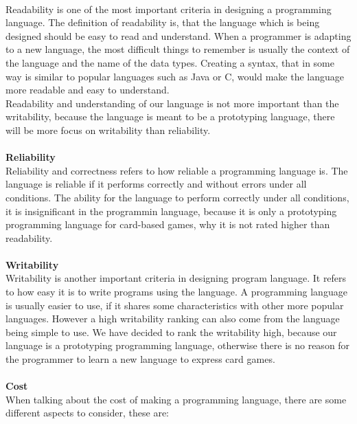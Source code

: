  \\
Readability is one of the most important criteria in designing a programming language. The definition of readability is, that the language which is being designed should be easy to read and understand. When a programmer is adapting to a new language, the most difficult things to remember is usually the context of the language and the name of the data types. Creating a syntax, that in some way is similar to popular languages such as Java or C, would make the language more readable and easy to understand. \\
Readability and understanding of our language is not more important than the writability, because the language is meant to be a prototyping language, there will be more focus on writability than reliability.
\\ \\
\textbf{Reliability} \\
Reliability and correctness refers to how reliable a programming language is. The language is reliable if it performs correctly and without errors under all conditions. The ability for the language to perform correctly under all conditions, it is insignificant in the programmin language, because it is only a prototyping programming language for card-based games, why it is not rated higher than readability.
\\ \\
\textbf{Writability} \\
Writability is another important criteria in designing program language. It refers to how easy it is to write programs using the language. A programming language is usually easier to use, if it shares some characteristics with other more popular languages. However a high writability ranking can also come from the language being simple to use. We have decided to rank the writability high, because our language is a prototyping programming language, otherwise there is no reason for the programmer to learn a new language to express card games.
\\ \\
\textbf{Cost} \\
When talking about the cost of making a programming language, there are some different aspects to consider, these are:
